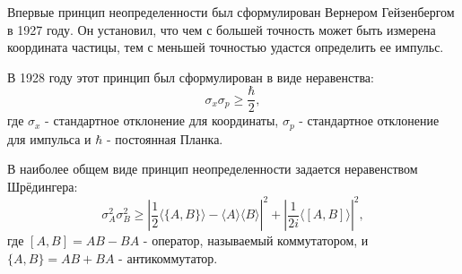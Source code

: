 \documentclass[11pt]{article}
\begin{document}
Впервые принцип неопределенности был сформулирован Вернером Гейзенбергом в 1927 году. Он установил, что чем с большей точность может быть измерена координата частицы, тем с меньшей точностью удастся определить ее импульс.

В 1928 году этот принцип был сформулирован в виде неравенства:
\[
\sigma_x\sigma_p \geq \frac{\hbar}{2},
\]
где $\sigma_x$  - стандартное отклонение для координаты, $\sigma_p$ - стандартное отклонение для импульса и $\hbar$ - постоянная Планка.

В наиболее общем виде принцип неопределенности задается неравенством Шрёдингера:
\begin{equation}
\sigma_A^2\sigma_B^2 \geq \left| \frac{1}{2}\langle\{A, B\}\rangle - \langle A\rangle\langle B\rangle \right|^2 + \left| \frac{1}{2i}\langle [A, B]\rangle\right|^2,
\label{eq:Schrodinger_ineq}
\end{equation}
где $[A, B] = AB - BA$ - оператор, называемый коммутатором, и $\{A, B\} = AB + BA$ - антикоммутатор.
\end{document}
